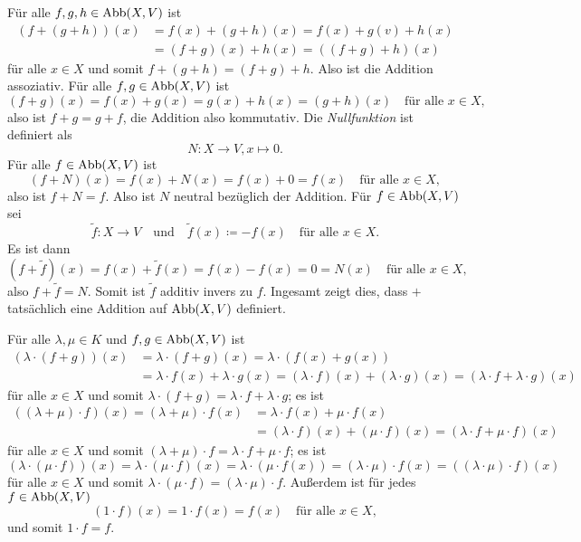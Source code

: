 Für alle $f,g,h \in \mathrm{Abb}(X,V)$ ist
\begin{align*}
 (f+(g+h))(x)
 &= f(x) + (g+h)(x)
 = f(x) + g(v) + h(x) \\
 &= (f+g)(x) + h(x)
 = ((f+g)+h)(x)
\end{align*}
für alle $x \in X$ und somit $f+(g+h) = (f+g)+h$. Also ist die Addition assoziativ. Für alle $f,g \in \mathrm{Abb}(X,V)$ ist
\[
 (f+g)(x) = f(x) + g(x) = g(x) + h(x) = (g+h)(x)
 \quad
 \text{für alle $x \in X$},
\]
also ist $f+g = g+f$, die Addition also kommutativ. Die \emph{Nullfunktion} ist definiert als
\[
 N \colon X \to V, x \mapsto 0.
\]
Für alle $f \in \mathrm{Abb}(X,V)$ ist
\[
 (f+N)(x) = f(x) + N(x) = f(x) + 0 = f(x)
 \quad
 \text{für alle $x \in X$},
\]
also ist $f+N = f$. Also ist $N$ neutral bezüglich der Addition. Für $f \in \mathrm{Abb}(X,V)$ sei
\[
 \tilde{f} \colon X \to V
 \quad\text{und}\quad
 \tilde{f}(x) \coloneqq -f(x)
 \quad
 \text{für alle $x \in X$}.
\]
Es ist dann
\[
 (f+\tilde{f})(x)
 = f(x) + \tilde{f}(x)
 = f(x) - f(x)
 = 0
 = N(x)
 \quad
 \text{für alle $x \in X$},
\]
also $f+\tilde{f} = N$. Somit ist $\tilde{f}$ additiv invers zu $f$. Ingesamt zeigt dies, dass $+$ tatsächlich eine Addition auf $\mathrm{Abb}(X,V)$ definiert.

Für alle $\lambda, \mu \in K$ und $f,g \in \mathrm{Abb}(X,V)$ ist
\begin{align*}
 (\lambda \cdot (f+g))(x)
 &= \lambda \cdot (f+g)(x)
 = \lambda \cdot (f(x)+g(x)) \\
 &= \lambda \cdot f(x) + \lambda \cdot g(x)
 = (\lambda \cdot f)(x) + (\lambda \cdot g)(x)
 = (\lambda \cdot f + \lambda \cdot g)(x)
\end{align*}
für alle $x \in X$ und somit $\lambda \cdot (f+g) = \lambda \cdot f + \lambda \cdot g$; es ist
\begin{align*}
 ((\lambda + \mu) \cdot f)(x)
 = (\lambda+\mu) \cdot f(x)
 &= \lambda \cdot f(x) + \mu \cdot f(x) \\
 &= (\lambda \cdot f)(x) + (\mu \cdot f)(x)
 = (\lambda \cdot f + \mu \cdot f)(x)
\end{align*}
für alle $x \in X$ und somit $(\lambda + \mu) \cdot f = \lambda \cdot f + \mu \cdot f$; es ist
\[
 (\lambda \cdot (\mu \cdot f))(x)
 = \lambda \cdot (\mu \cdot f)(x)
 = \lambda \cdot (\mu \cdot f(x))
 = (\lambda \cdot \mu) \cdot f(x)
 = ((\lambda \cdot \mu) \cdot f)(x)
\]
für alle $x \in X$ und somit $\lambda \cdot (\mu \cdot f) = (\lambda \cdot \mu) \cdot f$. Außerdem ist für jedes $f \in \mathrm{Abb}(X,V)$
\[
 (1 \cdot f)(x)
 = 1 \cdot f(x)
 = f(x)
 \quad
 \text{für alle $x \in X$},
\]
und somit $1 \cdot f = f$.

